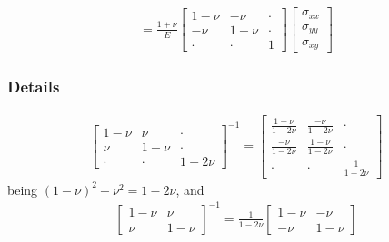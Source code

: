 \documentclass[letterpaper,10pt,english]{jupyterBook}
\begin{document}
\begin{equation*}
\begin{split}
= 
\frac{1+\nu}{E}
\begin{bmatrix} 1-\nu & -\nu & \cdot \\ -\nu & 1-\nu & \cdot \\ \cdot & \cdot & 1 \end{bmatrix}
\begin{bmatrix} \sigma_{xx} \\ \sigma_{yy} \\ \sigma_{xy} \end{bmatrix}
\end{split}
\end{equation*}\subsubsection*{Details}
\begin{equation*}
\begin{split}
\begin{bmatrix} 1-\nu & \nu & \cdot \\ \nu & 1-\nu & \cdot \\ \cdot & \cdot & 1-2\nu  \end{bmatrix}^{-1} =
\begin{bmatrix}
  \frac{1-\nu}{1-2\nu} & \frac{ -\nu}{1-2\nu} & \cdot \\
  \frac{ -\nu}{1-2\nu} & \frac{1-\nu}{1-2\nu} & \cdot \\ 
  \cdot & \cdot & \frac{1}{1-2\nu}
\end{bmatrix}
\end{split}
\end{equation*}
\sphinxAtStartPar
being \((1-\nu)^2 - \nu^2 = 1-2\nu\), and
\begin{equation*}
\begin{split}\begin{bmatrix} 1-\nu & \nu \\ \nu & 1-\nu \end{bmatrix}^{-1} = \frac{1}{1-2\nu} \begin{bmatrix} 1-\nu & -\nu \\ -\nu & 1-\nu \end{bmatrix}\end{split}
\end{equation*}
\end{document}
